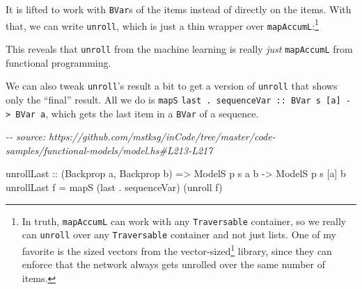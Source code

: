 \documentclass[]{article}
\newenvironment{Shaded}{}{}
\newcommand{\CommentTok}[1]{\textcolor[rgb]{0.38,0.63,0.69}{\textit{#1}}}
\newcommand{\DataTypeTok}[1]{\textcolor[rgb]{0.56,0.13,0.00}{#1}}
\newcommand{\FunctionTok}[1]{\textcolor[rgb]{0.02,0.16,0.49}{#1}}
\newcommand{\KeywordTok}[1]{\textcolor[rgb]{0.00,0.44,0.13}{\textbf{#1}}}
\newcommand{\NormalTok}[1]{#1}
\newcommand{\OperatorTok}[1]{\textcolor[rgb]{0.40,0.40,0.40}{#1}}
\newcommand{\OtherTok}[1]{\textcolor[rgb]{0.00,0.44,0.13}{#1}}
\renewcommand{\href}[2]{#2\footnote{\url{#1}}}
\begin{document}
It is lifted to work with \texttt{BVar}s of the items instead of directly on the
items. With that, we can write \texttt{unroll}, which is just a thin wrapper
over \texttt{mapAccumL}:\footnote{In truth, \texttt{mapAccumL} can work with any
  \texttt{Traversable} container, so we really can \texttt{unroll} over any
  \texttt{Traversable} container and not just lists. One of my favorite is the
  sized vectors from the
  \href{http://hackage.haskell.org/package/vector-sized}{vector-sized} library,
  since they can enforce that the network always gets unrolled over the same
  number of items.}

\begin{Shaded}
\end{Shaded}

This reveals that \texttt{unroll} from the machine learning is really
\emph{just} \texttt{mapAccumL} from functional programming.

We can also tweak \texttt{unroll}'s result a bit to get a version of
\texttt{unroll} that shows only the ``final'' result. All we do is \texttt{mapS}
\texttt{last\ .\ sequenceVar\ ::\ BVar\ s\ {[}a{]}\ -\textgreater{}\ BVar\ a},
which gets the last item in a \texttt{BVar} of a sequence.

\begin{Shaded}
\begin{Highlighting}[]
\CommentTok{{-}{-} source: https://github.com/mstksg/inCode/tree/master/code{-}samples/functional{-}models/model.hs\#L213{-}L217}

\NormalTok{unrollLast}
\OtherTok{    ::}\NormalTok{ (}\DataTypeTok{Backprop}\NormalTok{ a, }\DataTypeTok{Backprop}\NormalTok{ b)}
    \OtherTok{=\textgreater{}} \DataTypeTok{ModelS}\NormalTok{ p s  a  b}
    \OtherTok{{-}\textgreater{}} \DataTypeTok{ModelS}\NormalTok{ p s [a] b}
\NormalTok{unrollLast f }\OtherTok{=}\NormalTok{ mapS (}\FunctionTok{last} \OperatorTok{.}\NormalTok{ sequenceVar) (unroll f)}
\end{Highlighting}
\end{Shaded}
\end{document}
